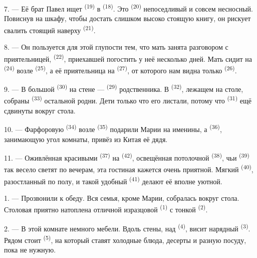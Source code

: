 \VUsaut{5.0mm}
\VUsaut{3.0mm}

7. --- Её брат Павел ищет  \textsuperscript{(19)} в
 \textsuperscript{(18)}. Это 
\textsuperscript{(20)} непоседливый и совсем несносный. Повиснув на шкафу, чтобы
достать слишком высоко стоящую книгу, он рискует свалить стоящий наверху
 \textsuperscript{(21)}.

8. --- Он пользуется для этой глупости тем, что мать занята разговором с
приятельницей,  \textsuperscript{(22)}, приехавшей погостить у неё
несколько дней. Мать сидит на  \textsuperscript{(24)} возле
 \textsuperscript{(25)}, а её приятельница на 
\textsuperscript{(27)}, от которого нам видна только 
\textsuperscript{(26)}.

9. --- В большой  \textsuperscript{(30)} на стене --- 
\textsuperscript{(29)} родственника. В  \textsuperscript{(32)},
лежащем на столе, собраны  \textsuperscript{(33)} остальной
родни. Дети только что его листали, потому что 
\textsuperscript{(31)} ещё сдвинуты вокруг стола.

10. --- Фарфоровую  \textsuperscript{(34)} возле
 \textsuperscript{(35)} подарили Марии на именины, а
 \textsuperscript{(36)}, занимающую угол комнаты, привёз из Китая
её дядя.

11. --- Оживлённая красивыми  \textsuperscript{(37)} на
 \textsuperscript{(42)}, освещённая потолочной 
\textsuperscript{(38)}, чьи  \textsuperscript{(39)} так
весело светят по вечерам, эта гостиная кажется очень приятной. Мягкий
 \textsuperscript{(40)}, разостланный по полу, и такой удобный
 \textsuperscript{(41)} делают её вполне уютной.

\VUsaut{3.6mm}
\VUsaut{3.0mm}

1. --- Прозвонили к обеду. Вся семья, кроме Марии, собралась вокруг
стола. Столовая приятно натоплена отличной изразцовой 
\textsuperscript{(1)} с тонкой  \textsuperscript{(2)}.

2. --- В этой комнате немного мебели. Вдоль стены, над 
\textsuperscript{(4)}, висит нарядный 
\textsuperscript{(3)}. Рядом стоит  \textsuperscript{(5)}, на который
ставят холодные блюда, десерты и разную посуду, пока не нужную.

